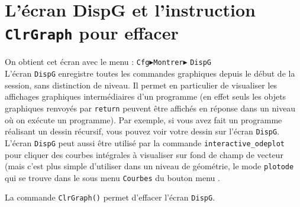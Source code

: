 \documentclass[a4paper,11pt]{article}
\begin{document}
\section{L'\'ecran DispG et l'instruction {\tt ClrGraph} pour effacer}
On obtient cet \'ecran avec le menu : 
{\tt Cfg}$\blacktriangleright${\tt Montrer}$\blacktriangleright$
{\tt DispG}\\
L'\'ecran {\tt DispG} enregistre toutes les commandes graphiques
depuis le d\'ebut de la session, sans distinction de niveau. Il
permet en particulier de visualiser les affichages graphiques
interm\'ediaires d'un programme (en effet seuls les objets graphiques
renvoy\'es par {\tt return} peuvent \^etre affich\'es en
r\'eponse dans un niveau o\`u on ex\'ecute un programme).
Par exemple, si vous avez fait un programme r\'ealisant un dessin
r\'ecursif, vous pouvez voir votre dessin sur l'\'ecran {\tt DispG}.
L'\'ecran {\tt DispG} peut aussi \^etre utilis\'e par la commande
{\tt interactive\_odeplot} pour cliquer des courbes int\'egrales \`a visualiser
sur fond de champ de vecteur (mais c'est plus simple d'utiliser dans un niveau 
de g\'eom\'etrie, le mode {\tt plotode} qui se trouve dans le sous menu 
{\tt Courbes} du bouton menu .

La commande {\tt ClrGraph()} permet d'effacer l'\'ecran {\tt DispG}.
\end{document}
